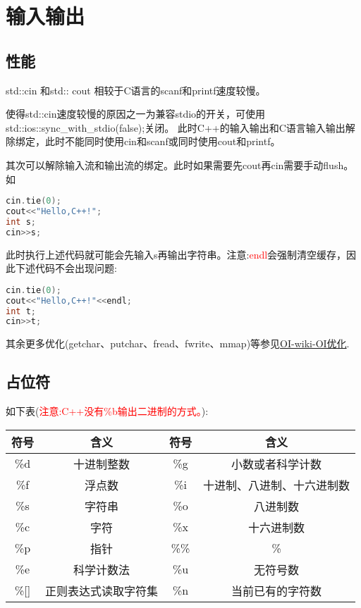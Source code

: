 \documentclass{article}
\begin{document}
    

    \section{输入输出}

    \subsection{性能}

    std::cin 和std:: cout 相较于C语言的scanf和printf速度较慢。

    使得std::cin速度较慢的原因之一为兼容stdio的开关，可使用std::ios::sync\_with\_stdio(false);关闭。
    此时C++的输入输出和C语言输入输出解除绑定，此时不能同时使用cin和scanf或同时使用cout和printf。

    其次可以解除输入流和输出流的绑定。此时如果需要先cout再cin需要手动flush。如
    \begin{lstlisting}[language=c++]
cin.tie(0);
cout<<"Hello,C++!";
int s;
cin>>s;        
    \end{lstlisting}
    此时执行上述代码就可能会先输入s再输出字符串。注意:\textcolor{red}{endl}会强制清空缓存，因此下述代码不会出现问题: 
    \begin{lstlisting}[language=c++]
cin.tie(0);
cout<<"Hello,C++!"<<endl;
int t;
cin>>t;
    \end{lstlisting}

    其余更多优化(getchar、putchar、fread、fwrite、mmap)等参见\href{https://oi-wiki.org/contest/io/}{OI-wiki-OI优化}.

    \subsection{占位符}
    如下表(\textcolor{red}{注意:C++没有\%b输出二进制的方式。}):

    \begin{table}[H]
        \centering
        \begin{tabular}{cccc}
            \hline
            符号 & 含义 & 符号 & 含义  \\ \hline
            \%d & 十进制整数  & \%g & 小数或者科学计数   \\
            \%f & 浮点数 & \%i & 十进制、八进制、十六进制数   \\
            \%s & 字符串 & \%o & 八进制数 \\
            \%c & 字符 & \%x & 十六进制数  \\
            \%p & 指针 & \%\%  & \%  \\
            \%e & 科学计数法 & \%u  & 无符号数 \\ 
            \%[] & 正则表达式读取字符集  & \%n & 当前已有的字符数 \\\hline
        \end{tabular}
    \end{table}
\end{document}
